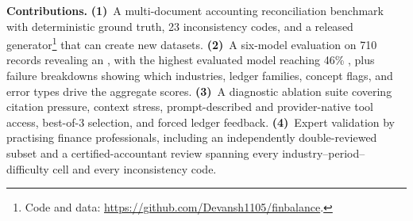 \textbf{Contributions.}
\textbf{(1)}~A multi-document accounting reconciliation benchmark with deterministic ground truth, 23 inconsistency codes, and a released generator\footnote{Code and data: \url{https://github.com/Devansh1105/finbalance}.} that can create new datasets. \textbf{(2)}~A six-model evaluation on 710 records revealing an \aggGap{}, with the highest evaluated model reaching 46\% \bsexact{}, plus failure breakdowns showing which industries, ledger families, concept flags, and error types drive the aggregate scores. \textbf{(3)}~A diagnostic ablation suite covering citation pressure, context stress, prompt-described and provider-native tool access, best-of-3 selection, and forced ledger feedback. \textbf{(4)}~Expert validation by practising finance professionals, including an independently double-reviewed subset and a certified-accountant review spanning every industry--period--difficulty cell and every inconsistency code.

